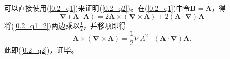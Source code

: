     
    可以直接使用(\ref{0.2_q1})来证明(\ref{0.2_q2})。在(\ref{0.2_q1})中令$\boldsymbol{B=A}$，得
    \begin{equation}
        \boldsymbol{\nabla({A}\cdot {A}) = }2\boldsymbol{{A}\times(\nabla\times {A}) + }2\boldsymbol{({A}\cdot \nabla){A}}
        \label{0.2_q1_2}
    \end{equation}
    将(\ref{0.2_q1_2})两边乘以$\frac{1}{2}$，并移项即得
    \begin{equation}
        \boldsymbol{{A}\times(\nabla\times {A}) = }\frac{1}{2}\nabla A^2 \boldsymbol{- ({A}\cdot \nabla){A}.}
    \end{equation}
    此即(\ref{0.2_q2})，证毕。
